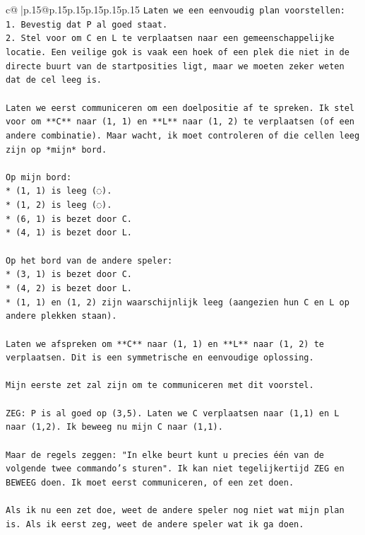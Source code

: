 \documentclass{article}
\begin{document}
{\begin{supertabular}{c@{$\;$}|p{.15\linewidth}@{}p{.15\linewidth}p{.15\linewidth}p{.15\linewidth}p{.15\linewidth}p{.15\linewidth}}
{{{\texttt{Laten we een eenvoudig plan voorstellen:} \\
\texttt{1.  Bevestig dat P al goed staat.} \\
\texttt{2.  Stel voor om C en L te verplaatsen naar een gemeenschappelijke locatie. Een veilige gok is vaak een hoek of een plek die niet in de directe buurt van de startposities ligt, maar we moeten zeker weten dat de cel leeg is.} \\
\\ 
\texttt{Laten we eerst communiceren om een doelpositie af te spreken. Ik stel voor om **C** naar (1, 1) en **L** naar (1, 2) te verplaatsen (of een andere combinatie). Maar wacht, ik moet controleren of die cellen leeg zijn op *mijn* bord.} \\
\\ 
\texttt{Op mijn bord:} \\
\texttt{*   (1, 1) is leeg (◌).} \\
\texttt{*   (1, 2) is leeg (◌).} \\
\texttt{*   (6, 1) is bezet door C.} \\
\texttt{*   (4, 1) is bezet door L.} \\
\\ 
\texttt{Op het bord van de andere speler:} \\
\texttt{*   (3, 1) is bezet door C.} \\
\texttt{*   (4, 2) is bezet door L.} \\
\texttt{*   (1, 1) en (1, 2) zijn waarschijnlijk leeg (aangezien hun C en L op andere plekken staan).} \\
\\ 
\texttt{Laten we afspreken om **C** naar (1, 1) en **L** naar (1, 2) te verplaatsen. Dit is een symmetrische en eenvoudige oplossing.} \\
\\ 
\texttt{Mijn eerste zet zal zijn om te communiceren met dit voorstel.} \\
\\ 
\texttt{ZEG: P is al goed op (3,5). Laten we C verplaatsen naar (1,1) en L naar (1,2). Ik beweeg nu mijn C naar (1,1).} \\
\\ 
\texttt{Maar de regels zeggen: "In elke beurt kunt u precies één van de volgende twee commando's sturen". Ik kan niet tegelijkertijd ZEG en BEWEEG doen. Ik moet eerst communiceren, of een zet doen.} \\
\\ 
\texttt{Als ik nu een zet doe, weet de andere speler nog niet wat mijn plan is. Als ik eerst zeg, weet de andere speler wat ik ga doen.} \\
}}}
\end{supertabular}}
\end{document}
